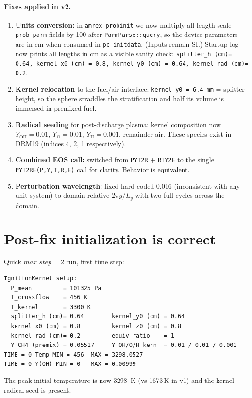 \documentclass[11pt,a4paper]{article}
\begin{document}
\paragraph{Fixes applied in v2.}
\begin{enumerate}[leftmargin=*]
\item \textbf{Units conversion:} in \texttt{amrex\_probinit} we now multiply all length-scale
      \texttt{prob\_parm} fields by 100 after \texttt{ParmParse::query}, so the device
      parameters are in cm when consumed in \texttt{pc\_initdata}. (Inputs remain SI.)
      Startup log now prints all lengths in cm as a visible sanity check:
      \texttt{splitter\_h (cm)= 0.64, kernel\_x0 (cm) = 0.8, kernel\_y0 (cm) = 0.64, kernel\_rad (cm)= 0.2}.
\item \textbf{Kernel relocation} to the fuel/air interface: \texttt{kernel\_y0 = 6.4\,mm} = splitter height,
      so the sphere straddles the stratification and half its volume is immersed in premixed fuel.
\item \textbf{Radical seeding} for post-discharge plasma: kernel composition now
      $Y_{\mathrm{OH}}{=}0.01,\ Y_{\mathrm{O}}{=}0.01,\ Y_{\mathrm{H}}{=}0.001$,
      remainder air. These species exist in DRM19 (indices 4, 2, 1 respectively).
\item \textbf{Combined EOS call:} switched from \texttt{PYT2R} + \texttt{RTY2E} to the single
      \texttt{PYT2RE(P,Y,T,R,E)} call for clarity. Behavior is equivalent.
\item \textbf{Perturbation wavelength:} fixed hard-coded 0.016 (inconsistent with any unit system)
      to domain-relative $2\pi y / L_y$ with two full cycles across the domain.
\end{enumerate}

\section{Post-fix initialization is correct}

Quick $max\_step=2$ run, first time step:
\begin{verbatim}
IgnitionKernel setup:
  P_mean         = 101325 Pa
  T_crossflow    = 456 K
  T_kernel       = 3300 K
  splitter_h (cm)= 0.64        kernel_y0 (cm) = 0.64
  kernel_x0 (cm) = 0.8         kernel_z0 (cm) = 0.8
  kernel_rad (cm)= 0.2         equiv_ratio    = 1
  Y_CH4 (premix) = 0.05517     Y_OH/O/H kern  = 0.01 / 0.01 / 0.001
TIME = 0 Temp MIN = 456  MAX = 3298.0527
TIME = 0 Y(OH) MIN = 0   MAX = 0.00999
\end{verbatim}
The peak initial temperature is now \SI{3298}{K} (vs 1673\,K in v1) and the kernel radical seed is present.
\end{document}
